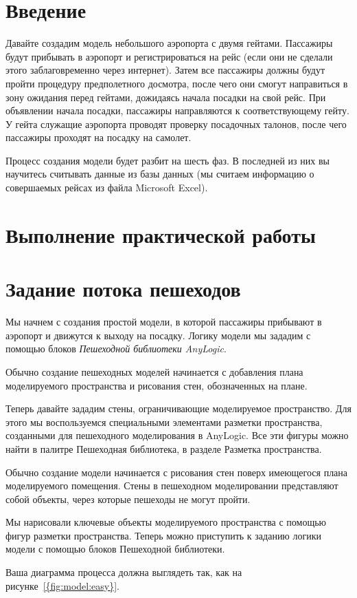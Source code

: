 \graphicspath{{./img}} %

\section*{\LARGE Введение}
Давайте создадим модель небольшого аэропорта с двумя гейтами. Пассажиры
будут прибывать в аэропорт и регистрироваться на рейс (если они не сделали
этого заблаговременно через интернет). Затем все пассажиры должны будут
пройти процедуру предполетного досмотра, после чего они смогут направиться
в зону ожидания перед гейтами, дожидаясь начала посадки на свой рейс. При
объявлении начала посадки, пассажиры направляются к соответствующему
гейту. У гейта служащие аэропорта проводят проверку посадочных талонов,
после чего пассажиры проходят на посадку на самолет.\par
Процесс создания модели будет разбит на шесть фаз. В последней из них вы
научитесь считывать данные из базы данных (мы считаем информацию о
совершаемых рейсах из файла Microsoft Excel).

\clearpage

\section*{\LARGE Выполнение практической работы}

\section{Задание потока пешеходов}
Мы начнем с создания простой модели, в которой пассажиры прибывают в
аэропорт и движутся к выходу на посадку. Логику модели мы зададим с
помощью блоков \textit{Пешеходной библиотеки AnyLogic}.\par
Обычно создание пешеходных моделей начинается с добавления плана
моделируемого пространства и рисования стен, обозначенных на плане.\par
Теперь давайте зададим стены, ограничивающие моделируемое пространство.
Для этого мы воспользуемся специальными элементами разметки пространства,
созданными для пешеходного моделирования в AnyLogic. Все эти фигуры можно
найти в палитре Пешеходная библиотека, в разделе Разметка пространства.\par
Обычно создание модели начинается с рисования стен поверх имеющегося
плана моделируемого помещения. Стены в пешеходном моделировании
представляют собой объекты, через которые пешеходы не могут пройти.\par
Мы нарисовали ключевые объекты моделируемого пространства с помощью
фигур разметки пространства. Теперь можно приступить к заданию логики
модели с помощью блоков Пешеходной библиотеки.\par
Ваша диаграмма процесса должна выглядеть так, как
на рисунке~\ref{{fig:model:easy}}.


